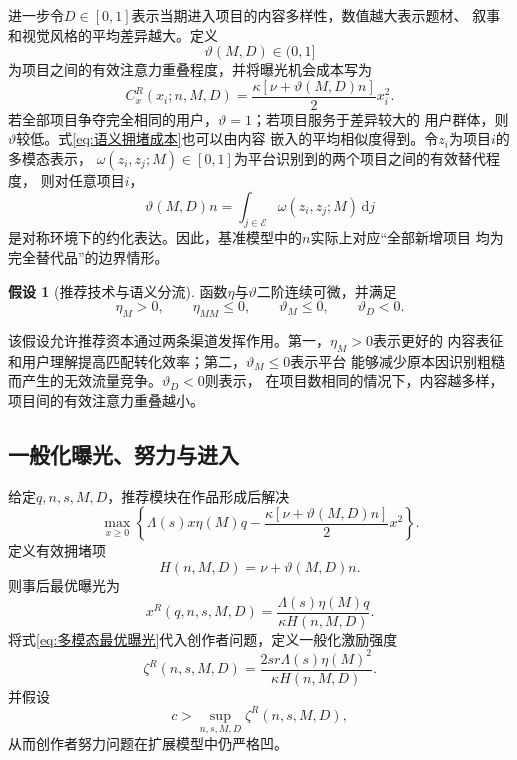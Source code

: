 \documentclass[UTF8, a4paper, 12pt, fontset=fandol]{ctexart}
\theoremstyle{definition}
\newtheorem{assumption}{假设}[section]
\theoremstyle{remark}
\begin{document}
进一步令$D\in[0,1]$表示当期进入项目的内容多样性，数值越大表示题材、
叙事和视觉风格的平均差异越大。定义
\begin{equation*}
  \vartheta(M,D)\in(0,1]
\end{equation*}
为项目之间的有效注意力重叠程度，并将曝光机会成本写为
\begin{equation}
  C_x^R(x_i;n,M,D)
  =\frac{\kappa[\nu+\vartheta(M,D)n]}{2}x_i^2.
  \label{eq:语义拥堵成本}
\end{equation}
若全部项目争夺完全相同的用户，$\vartheta=1$；若项目服务于差异较大的
用户群体，则$\vartheta$较低。式\eqref{eq:语义拥堵成本}也可以由内容
嵌入的平均相似度得到。令$z_i$为项目$i$的多模态表示，
$\omega(z_i,z_j;M)\in[0,1]$为平台识别到的两个项目之间的有效替代程度，
则对任意项目$i$，
\begin{equation*}
  \vartheta(M,D)n
  =\int_{j\in\mathcal E}\omega(z_i,z_j;M)\,\mathrm dj
\end{equation*}
是对称环境下的约化表达。因此，基准模型中的$n$实际上对应“全部新增项目
均为完全替代品”的边界情形。

\begin{assumption}[推荐技术与语义分流]
  \label{ass:推荐技术与语义分流}
  函数$\eta$与$\vartheta$二阶连续可微，并满足
  \begin{equation*}
    \eta_M>0,\qquad \eta_{MM}\leq0,
    \qquad
    \vartheta_M\leq0,\qquad \vartheta_D<0.
  \end{equation*}
\end{assumption}
该假设允许推荐资本通过两条渠道发挥作用。第一，$\eta_M>0$表示更好的
内容表征和用户理解提高匹配转化效率；第二，$\vartheta_M\leq0$表示平台
能够减少原本因识别粗糙而产生的无效流量竞争。$\vartheta_D<0$则表示，
在项目数相同的情况下，内容越多样，项目间的有效注意力重叠越小。

\subsection{一般化曝光、努力与进入}
给定$q,n,s,M,D$，推荐模块在作品形成后解决
\begin{equation*}
  \max_{x\geq0}
  \left\{
    \Lambda(s)x\eta(M)q
    -\frac{\kappa[\nu+\vartheta(M,D)n]}{2}x^2
  \right\}.
\end{equation*}
定义有效拥堵项
\begin{equation*}
  H(n,M,D)=\nu+\vartheta(M,D)n.
\end{equation*}
则事后最优曝光为
\begin{equation}
  x^R(q,n,s,M,D)
  =\frac{\Lambda(s)\eta(M)q}{\kappa H(n,M,D)}.
  \label{eq:多模态最优曝光}
\end{equation}
将式\eqref{eq:多模态最优曝光}代入创作者问题，定义一般化激励强度
\begin{equation}
  \zeta^R(n,s,M,D)
  =\frac{2sr\Lambda(s)\eta(M)^2}
  {\kappa H(n,M,D)}.
  \label{eq:多模态激励强度}
\end{equation}
并假设
\begin{equation*}
  c>\sup_{n,s,M,D}\zeta^R(n,s,M,D),
\end{equation*}
从而创作者努力问题在扩展模型中仍严格凹。
\end{document}
